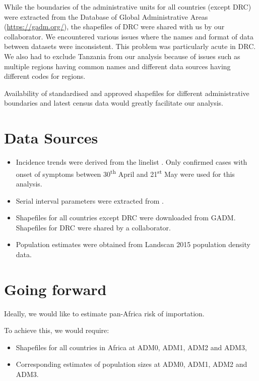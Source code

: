 \documentclass[11pt,]{article}
\begin{document}
While the boundaries of the administrative units for all
countries (except DRC) were extracted from the Database of Global Administrative Areas (\url{https://gadm.org/}),
 the shapefiles of DRC were shared with us by our collaborator.
We encountered various issues where the names and format of data
between datasets were inconsistent.
This problem was particularly acute in DRC. We also had to exclude
Tanzania from our analysis because of issues such as multiple regions
having common names and different data sources having different codes
for regions.

Availability of standardised and approved shapefiles for different
administrative boundaries and latest census data would greatly facilitate our analysis.



\section*{Data Sources}
\begin{itemize}
\item Incidence trends were derived from the linelist \citep{who2018drc}. Only confirmed
  cases with onset of symptoms between 30\textsuperscript{th} April
  and 21\textsuperscript{st} May were used for this analysis. 
 \item Serial interval parameters were extracted from \citep{who2014ebola}.
 \item Shapefiles for all countries except DRC were downloaded from
   GADM. Shapefiles for DRC were shared by a collaborator.
 \item Population estimates were obtained from Landscan 2015
   population density data.
 \end{itemize}


\section*{Going forward}

Ideally, we would like to estimate pan-Africa  risk of importation.

To achieve this, we would require:
\begin{itemize}
 \item Shapefiles for all countries in Africa at ADM0, ADM1, ADM2 and ADM3,
 \item Corresponding estimates of population sizes at ADM0, ADM1, ADM2 and ADM3.
\end{itemize}
\end{document}
